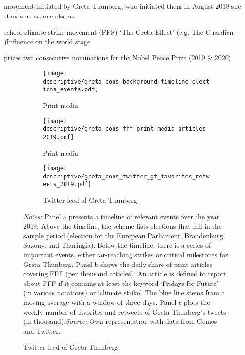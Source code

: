 movement initiated by Greta Thunberg, who initiated them in August 2018
she stands as no-one else as 

school climate strike movement (FFF)
`The Greta Effect' (e.g. The Guardian )Influence on the world stage

prizes 
two consecutive nominations for the Nobel Peace Prize (2019 \& 2020)







\newpage




\begin{landscape}
	\vspace*{\fill}
	\begin{figure}[H]\centering\caption{Important events surrounding FFF and perception in (social) media}

		
		
	
	
	
	
	\begin{subfigure}[h]{0.85\linewidth}\centering\caption{Print media}
		\texttt{[image: descriptive/greta\_cons\_background\_timeline\_elections\_events.pdf]}
	\end{subfigure}
	
	
	\par\bigskip\smallskip %
		\begin{subfigure}[h]{0.43\linewidth}\centering\caption{Print media}
			\texttt{[image: descriptive/greta\_cons\_fff\_print\_media\_articles\_2019.pdf]}
		\end{subfigure}
		\begin{subfigure}[h]{0.43\linewidth}\centering\caption{Twitter feed of Greta Thunberg}
			\texttt{[image: descriptive/greta\_cons\_twitter\_gt\_favorites\_retweets\_2019.pdf]}
		\end{subfigure}
		
		\begin{minipage}{0.86\linewidth}
			\scriptsize{\emph{Notes:} Panel a presents a timeline of relevant events over the year 2019. Above the timeline, the scheme lists elections that fall in the sample period (election for the European Parliament, Brandenburg, Saxony, and Thuringia). Below the timeline, there is a series of important events, either far-reaching strikes or critical milestones for Greta Thunberg. Panel b shows the daily share of print articles covering FFF (per thousand articles). An article is defined to report about FFF if it contains at least the keyword `Fridays for Future' (in various notations) or `climate strike'. The blue line stems from a moving average with a window of three days. Panel c plots the weekly number of favorites and retweets of Greta Thunberg's tweets (in thousand).\newline \emph{Source:} Own representation with data from Genios and Twitter.}
		\end{minipage}
	\end{figure}
	\vspace*{\fill}\clearpage
\end{landscape}
